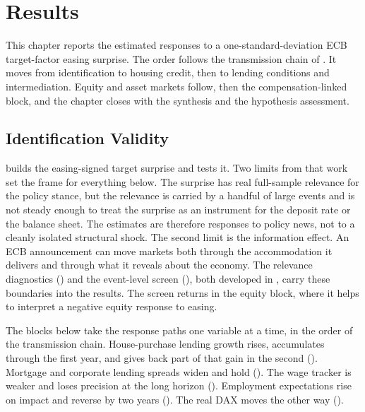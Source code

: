 \chapter{Results}
\label{chap:results}

This chapter reports the estimated responses to a one-standard-deviation ECB target-factor easing surprise. The order follows the transmission chain of . It moves from identification to housing credit, then to lending conditions and intermediation. Equity and asset markets follow, then the compensation-linked block, and the chapter closes with the synthesis and the hypothesis assessment.

\section{Identification Validity}

 builds the easing-signed target surprise and tests it. Two limits from that work set the frame for everything below. The surprise has real full-sample relevance for the policy stance, but the relevance is carried by a handful of large events and is not steady enough to treat the surprise as an instrument for the deposit rate or the balance sheet. The estimates are therefore responses to policy news, not to a cleanly isolated structural shock. The second limit is the information effect. An ECB announcement can move markets both through the accommodation it delivers and through what it reveals about the economy. The relevance diagnostics () and the event-level screen (), both developed in , carry these boundaries into the results. The screen returns in the equity block, where it helps to interpret a negative equity response to easing.

The blocks below take the response paths one variable at a time, in the order of the transmission chain. House-purchase lending growth rises, accumulates through the first year, and gives back part of that gain in the second (). Mortgage and corporate lending spreads widen and hold (). The wage tracker is weaker and loses precision at the long horizon (). Employment expectations rise on impact and reverse by two years (). The real DAX moves the other way ().

